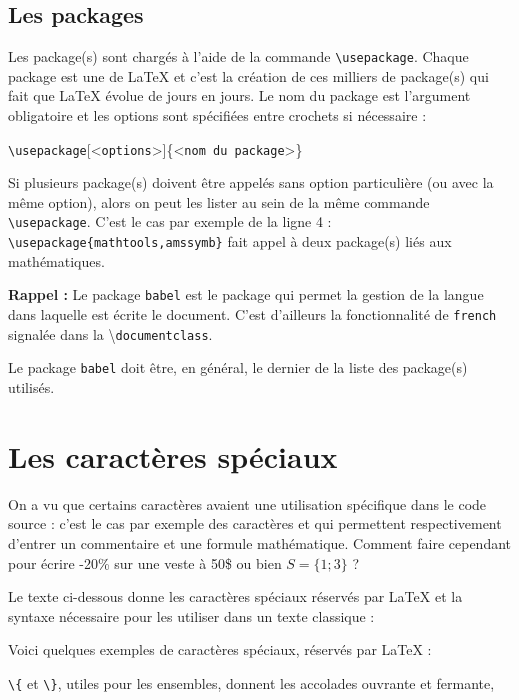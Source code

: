 \subsection{Les packages}

Les package(s) sont chargés à l'aide de la commande \verb!\usepackage!. Chaque package est une  de \LaTeX{} et c'est la création de ces milliers de package(s) qui fait que \LaTeX{} évolue de jours en jours. Le nom du package est l'argument obligatoire et les options sont spécifiées entre crochets si nécessaire :
\begin{center}
    \verb!\usepackage![<\verb!options!>]\{<\verb!nom du package!>\}
\end{center}
Si plusieurs package(s) doivent être appelés sans option particulière (ou avec la même option), alors on peut les lister au sein de la même commande \verb!\usepackage!. C'est le cas par exemple de la ligne 4 : \verb!\usepackage{mathtools,amssymb}! fait appel à deux package(s) liés aux mathématiques.

\begin{info}
    \textbf{Rappel :} Le package \verb!babel! est le package qui permet la gestion de la langue dans laquelle est écrite le document. C'est d'ailleurs la fonctionnalité de \verb!french! signalée dans la  \textbackslash\verb!documentclass!.\par
    Le package \verb!babel! doit être, en général, le dernier de la liste des package(s) utilisés.
\end{info}

\section{Les caractères spéciaux}

On a vu que certains caractères avaient une utilisation spécifique dans le code source : c'est le cas par exemple des caractères \ordi{\%} et \ordi{\$} qui permettent respectivement d'entrer un commentaire et une formule mathématique. Comment faire cependant pour écrire -20\% sur une veste à 50\$ ou bien $S = \{ 1 ; 3 \}$ ?\par
Le \og texte\fg{} ci-dessous donne les caractères spéciaux réservés par \LaTeX{} et la syntaxe nécessaire pour les utiliser dans un texte classique :

Voici quelques exemples de caractères spéciaux, réservés par \LaTeX{} :

\verb!\{! et \verb!\}!, utiles pour les ensembles, donnent les accolades ouvrante et fermante,

